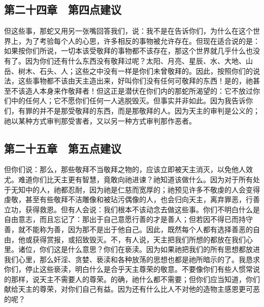 
\subsection{第二十四章　第四点建议}

但这些事，那蛇又用另一张嘴回答我们，说：我不是在告诉你们，为什么在这个世界上，为了考验每个人的心思，许多相反的事物被允许存在。但现在适合说的是：如果按你们所说，一切本该受敬拜的事物都不该存在，那这个世界就几乎什么也没有了。因为你们还有什么东西没有敬拜过呢？太阳、月亮、星辰、水、大地、山岳、树木、石头、人；这些之中没有一样是你们未曾敬拜的。因此，按照你们的说法，这些事物都不该由天主造出来，好叫你们没有任何可敬拜的东西！是的，祂甚至不该造人本身来作敬拜者！但这正是潜伏在你们内的那蛇所渴望的：它不放过你们中的任何人；它不愿你们任何一人逃脱毁灭。但事实并非如此。因为我告诉你们，有罪的并不是那受敬拜的东西，而是那敬拜的人。因为天主的审判是公义的；祂以某种方式审判那受害者，又以另一种方式审判那作恶者。\par


\subsection{第二十五章　第五点建议}

但你们说：那么，那些敬拜不当敬拜之物的，应该立即被天主消灭，以免他人效尤。难道你们比天主更有智慧，竟敢向祂进谏？祂知道该做什么。因为对于所有处于无知中的人，祂都忍耐，因为祂是仁慈而宽厚的；祂预见许多不敬虔的人会变得虔敬，甚至有些敬拜不洁雕像和被玷污偶像的人，也会归向天主，离弃罪恶，行善立功，获得救恩。但有人会说：我们根本不该动念去做这些事。你们不明白什么是自由意志，而且忘记了：那出于自己意愿行善的才是善人；但若因不得已而持守善，就不能称为善，因为那不是出于他自己。因此，既然每个人都有选择善恶的自由，他或获得赏报，或招致毁灭。不，有人说，天主把我们所想的都放在我们心里。诸位，你们这是什么意思？你们在亵渎。因为如果祂把我们的所有思想都放进我们心里，那么奸淫、贪婪、亵渎和各种放荡的思想也都是祂所暗示的了。我恳求你们，停止这些亵渎，明白什么是合乎天主尊荣的敬意。不要像你们有些人惯常说的那样，说天主不需要人的尊荣。的确，祂什么都不需要；但你们应当知道，你们献给天主的尊荣，对你们自己有益。因为还有什么比人不对他的造物主感恩更可恶的呢？\par

